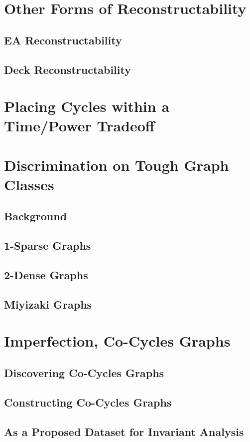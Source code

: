 \documentclass[11pt,a4paper]{report}
\begin{document}
\section{Other Forms of Reconstructability}
\subsection{EA Reconstructability}
\subsection{Deck Reconstructability}

\section{Placing Cycles within a Time/Power Tradeoff}

\section{Discrimination  on Tough Graph Classes}
\subsection{Background}
\subsection{1-Sparse Graphs}
\subsection{2-Dense Graphs}
\subsection{Miyizaki Graphs}

\section{Imperfection, Co-Cycles Graphs}
\subsection{Discovering Co-Cycles Graphs}
\subsection{Constructing Co-Cycles Graphs}
\subsection{As a Proposed Dataset for Invariant Analysis}
\end{document}
